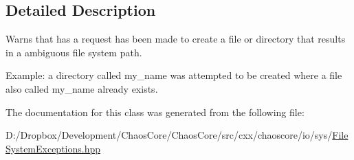 \subsection{Detailed Description}
Warns that has a request has been made to create a file or directory that results in a ambiguous file system path. 

Example\+: a directory called \textquotesingle{}my\+\_\+name\textquotesingle{} was attempted to be created where a file also called \textquotesingle{}my\+\_\+name\textquotesingle{} already exists. 

The documentation for this class was generated from the following file\+:\begin{DoxyCompactItemize}
\item 
D\+:/\+Dropbox/\+Development/\+Chaos\+Core/\+Chaos\+Core/src/cxx/chaoscore/io/sys/\hyperlink{_file_system_exceptions_8hpp}{File\+System\+Exceptions.\+hpp}\end{DoxyCompactItemize}

